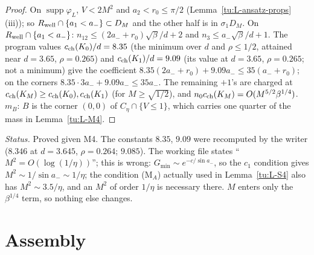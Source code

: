 \begin{proof}
On $\operatorname{supp}\varphi_L$, $V<2M^2$ and $a_2<r_0\le\pi/2$ (Lemma~\ref{tu:L-ansatz-props}(iii)); so
$R_{\rm well}\cap\{a_1<a_-\}\subset D_M$ and the other half is in $\sigma_1D_M$. On $R_{\rm well}\cap\{a_1<a_-\}$:
$n_{12}\le(2a_-+r_0)\sqrt\beta/d+2$ and $n_3\le a_-\sqrt\beta/d+1$. The program values $c_{\rm ch}(K_0)/d=8.35$ (the minimum over
$d$ and $\rho\le1/2$, attained near $d=3.65$, $\rho=0.265$) and $c_{\rm ch}(K_1)/d=9.09$ (its value at $d=3.65$, $\rho=0.265$; not a minimum) give the coefficient
$8.35(2a_-+r_0)+9.09a_-\le35(a_-+r_0)$; on the corners $8.35\cdot3a_-+9.09a_-\le35a_-$. The remaining $+1$'s are charged at
$c_{\rm ch}(K_M)\ge c_{\rm ch}(K_0),c_{\rm ch}(K_1)$ (for $M\ge\sqrt{1/2}$), and $n_0c_{\rm ch}(K_M)=O(M^{5/2}\beta^{1/4})$. $m_B$: $B$ is the corner
$(0,0)$ of $C_\eta\cap\{V\le1\}$, which carries one quarter of the mass in Lemma~\ref{tu:L-M4}.
\end{proof}

\noindent\emph{Status.} Proved given M4. The constants $8.35$, $9.09$ were recomputed by the writer ($8.346$ at $d=3.645$, $\rho=0.264$;
$9.085$). The working file states ``$M^2=O(\log(1/\eta))$''; this is wrong: $G_{\min}\sim e^{-c/\sin a_-}$, so the $c_1$ condition
gives $M^2\sim1/\sin a_-\sim1/\eta$; the condition (M$_A$) actually used in Lemma~\ref{tu:L-S4} also has $M^2\sim3.5/\eta$, and an $M^2$ of order $1/\eta$ is necessary there. $M$ enters only the $\beta^{1/4}$ term, so nothing else changes.

\section{Assembly}\label{tu:L-sec-assembly}

